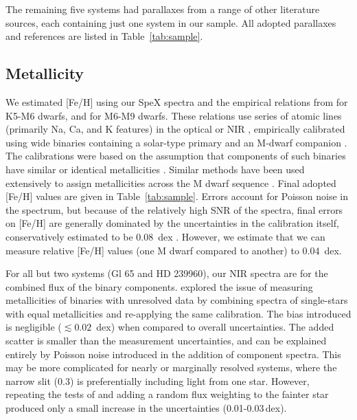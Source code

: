 \documentclass[twocolumn]{aastex62}
\begin{document}
The remaining five systems had parallaxes from a range of other literature sources, each containing just one system in our sample. All adopted parallaxes and references are listed in Table~\ref{tab:sample}.


\subsection{Metallicity}\label{sec:feh}

We estimated [Fe/H] using our SpeX spectra and the empirical relations from \citet{Mann2013a} for K5-M6 dwarfs, and \citet{Mann2014} for M6-M9 dwarfs. These relations use series of atomic lines (primarily Na, Ca, and K features) in the optical or NIR \citep[e.g.,][]{RojasAyala:2010,Terrien:2012lr}, empirically calibrated using wide binaries containing a solar-type primary and an M-dwarf companion \citep[e.g.,][]{Bonfils:2005,Johnson2009,Neves2012}. The calibrations were based on the assumption that components of such binaries have similar or identical metallicities \citep[e.g.,][]{2015ApJ...801L..10T}. Similar methods have been used extensively to assign metallicities across the M dwarf sequence \citep[e.g.,][]{Terrien2015,Muirhead2015,Dressing2017,2018ApJ...853...30V,2018ApJ...854..145M}. Final adopted [Fe/H] values are given in Table~\ref{tab:sample}. Errors account for Poisson noise in the spectrum, but because of the relatively high SNR of the spectra, final errors on [Fe/H] are generally dominated by the uncertainties in the calibration itself, conservatively estimated to be 0.08~dex \citep{Mann2013a,Mann2014}. However, we estimate that we can measure relative [Fe/H] values (one M dwarf compared to another) to 0.04~dex. 

For all but two systems (Gl 65 and HD 239960), our NIR spectra are for the combined flux of the binary components. \citet{Mann2014} explored the issue of measuring metallicities of binaries with unresolved data by combining spectra of single-stars with equal metallicities and re-applying the same calibration. The bias introduced is negligible ($\lesssim0.02$~dex) when compared to overall uncertainties. The added scatter is smaller than the measurement uncertainties, and can be explained entirely by Poisson noise introduced in the addition of component spectra. This may be more complicated for nearly or marginally resolved systems, where the narrow slit (0.3\arcsec) is preferentially including light from one star. However, repeating the tests of \citet{Mann2014} and adding a random flux weighting to the fainter star produced only a small increase in the uncertainties (0.01-0.03\,dex).
\end{document}
